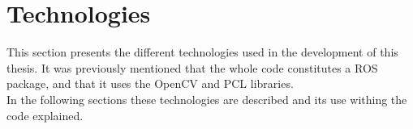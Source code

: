\section{Technologies}
\label{technologies}

This section presents the different technologies used in the development of this thesis. It was previously mentioned that the whole code constitutes a ROS package, and that it uses the OpenCV and PCL libraries. 
\\

In the following sections these technologies are described and its use withing the code explained. 











